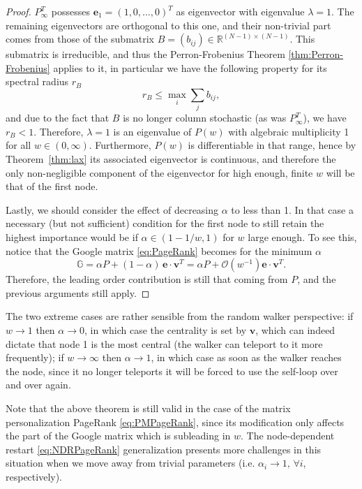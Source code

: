 \documentclass[sn-mathphys-ay]{sn-jnl}%
\newcommand{\R}{\mathbb{R}}
\newcommand{\bv}{\bm{v}}
\newcommand{\be}{\mathbf{e}}
\theoremstyle{thmstyleone}%
\theoremstyle{thmstyletwo}%
\theoremstyle{thmstylethree}%
\begin{document}
\begin{proof}
	$P_\infty^T$ possesses $\be_1=(1,0,\dots,0)^T$ as eigenvector with eigenvalue $\lambda=1$. The remaining eigenvectors are orthogonal to this one, and their non-trivial part comes from those of the submatrix $B=(b_{ij})\in\R^{(N-1)\times(N-1)}$. This submatrix is irreducible, and thus the Perron-Frobenius Theorem \ref{thm:Perron-Frobenius} applies to it, in particular we have the following property for its spectral radius $r_B$ \cite{meyer2001matrix}
	\begin{equation}
		r_B \leq \max_i\sum_{j} b_{ij},
	\end{equation}
	and due to the fact that $B$ is no longer column stochastic (as was $P_\infty^T$), we have $r_B<1$. Therefore, $\lambda = 1$ is an eigenvalue of $P(w)$ with algebraic multiplicity 1 for all $w\in(0,\infty)$. Furthermore, $P(w)$ is differentiable in that range, hence by Theorem~\ref{thm:lax} its associated eigenvector is continuous, and therefore the only non-negligible component of the eigenvector for high enough, finite $w$ will be that of the first node.
	
	Lastly, we should consider the effect of decreasing $\alpha$ to less than 1. In that case a necessary (but not sufficient) condition for the first node to still retain the highest importance would be if $\alpha \in (1 - 1/w, 1)$ for $w$ large enough. To see this, notice that the Google matrix \eqref{eq:PageRank} becomes for the minimum $\alpha$
	\begin{equation}
		\mathbb{G} = \alpha P + (1-\alpha)\, \be \cdot \bv^T = \alpha P + \mathcal{O}(w^{-1}) \be \cdot \bv^T. 
	\end{equation}
	Therefore, the leading order contribution is still that coming from $P$, and the previous arguments still apply. 
\end{proof}


The two extreme cases are rather sensible from the random walker perspective: if $w\rightarrow 1$ then $\alpha\rightarrow 0$, in which case the centrality is set by $\bv$, which can indeed dictate that node 1 is the most central (the walker can teleport to it more frequently); if $w\rightarrow\infty$ then $\alpha\rightarrow 1$, in which case as soon as the walker reaches the node, since it no longer teleports it will be forced to use the self-loop over and over again.


Note that the above theorem is still valid in the case of the matrix personalization PageRank \eqref{eq:PMPageRank}, since its modification only affects the part of the Google matrix which is subleading in $w$. The node-dependent restart \eqref{eq:NDRPageRank} generalization presents more challenges in this situation when we move away from trivial parameters (i.e. $\alpha_i\rightarrow1,\,\forall i$, respectively).
\end{document}
